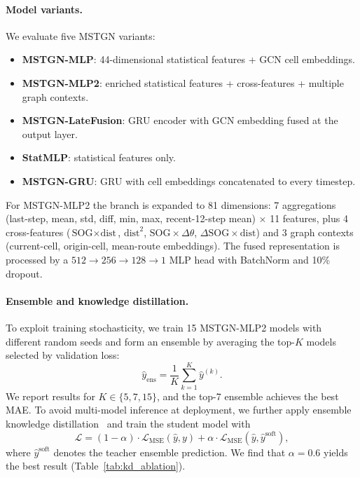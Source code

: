 \documentclass[sigconf,anonymous]{acmart}%
\begin{document}
\paragraph{Model variants.}
We evaluate five MSTGN variants:
\begin{itemize}
    \item \textbf{MSTGN-MLP}: 44-dimensional statistical features + GCN cell embeddings.
    \item \textbf{MSTGN-MLP2}: enriched statistical features + cross-features + multiple graph contexts.
    \item \textbf{MSTGN-LateFusion}: GRU encoder with GCN embedding fused at the output layer.
    \item \textbf{StatMLP}: statistical features only.
    \item \textbf{MSTGN-GRU}: GRU with cell embeddings concatenated to every timestep.
\end{itemize}

For MSTGN-MLP2 the branch is expanded to 81 dimensions: 7 aggregations (last-step, mean, std, diff, min, max, recent-12-step mean) $\times$ 11 features, plus 4 cross-features ($\text{SOG}{\times}\text{dist}$, $\text{dist}^2$, $\text{SOG}{\times}\Delta\theta$, $\Delta\text{SOG}{\times}\text{dist}$) and 3 graph contexts (current-cell, origin-cell, mean-route embeddings). The fused representation is processed by a $512 \to 256 \to 128 \to 1$ MLP head with BatchNorm and 10\% dropout.

\paragraph{Ensemble and knowledge distillation.}
To exploit training stochasticity, we train 15 MSTGN-MLP2 models with different random seeds and form an ensemble by averaging the top-$K$ models selected by validation loss:
\begin{equation}
    \hat{y}_{\text{ens}} = \frac{1}{K} \sum_{k=1}^{K} \hat{y}^{(k)}.
\end{equation}
We report results for $K \in \{5,7,15\}$, and the top-7 ensemble achieves the best MAE. To avoid multi-model inference at deployment, we further apply ensemble knowledge distillation~\cite{hinton2015distilling} and train the student model with
\begin{equation}
    \mathcal{L} = (1-\alpha)\cdot\mathcal{L}_{\text{MSE}}(\hat{y}, y) + \alpha\cdot\mathcal{L}_{\text{MSE}}(\hat{y}, \hat{y}^{\text{soft}}),
    \label{eq:kd_loss}
\end{equation}
where $\hat{y}^{\text{soft}}$ denotes the teacher ensemble prediction. We find that $\alpha = 0.6$ yields the best result (Table~\ref{tab:kd_ablation}).
\end{document}
